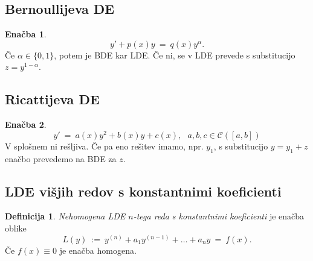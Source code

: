 \documentclass[11pt]{article}
\newcommand{\set}[1]{\{#1\}}
\theoremstyle{definition}
\newtheorem{definicija}{Definicija}[section]
\theoremstyle{definition}
\theoremstyle{definition}
\theoremstyle{definition}
\newtheorem{enacba}{Enačba}
\begin{document}

\subsection{Bernoullijeva DE}
\vspace{0.5cm}

\begin{enacba}

$$y' + p(x)y ~=~ q(x)y^{\alpha}.$$
Če $\alpha \in \set{0,1}$, potem je BDE kar LDE. Če ni, se v LDE prevede s substitucijo $z = y^{1-\alpha}$.

\end{enacba}
\vspace{0.5cm}


\subsection{Ricattijeva DE}
\vspace{0.5cm}

\begin{enacba}

$$y' ~=~ a(x)y^2 + b(x)y + c(x), ~~~a,b,c \in \mathcal{C}([a,b])$$
V splošnem ni rešljiva. Če pa eno rešitev imamo, npr. $y_1$, s substitucijo $y = y_1 + z$ enačbo prevedemo na BDE za $z$.

\end{enacba}
\vspace{0.5cm}


\subsection{LDE višjih redov s konstantnimi koeficienti}
\vspace{0.5cm}

\begin{definicija}

\textit{Nehomogena LDE $n$-tega reda s konstantnimi koeficienti} je enačba oblike
$$L(y) ~:=~ y^{(n)} + a_1 y^{(n-1)} + \ldots + a_n y ~=~ f(x).$$
Če $f(x) \equiv 0$ je enačba homogena.

\end{definicija}
\vspace{0.5cm}
\end{document}
